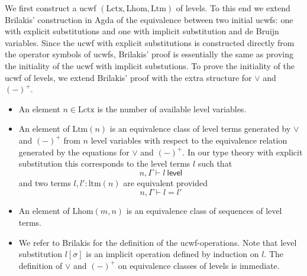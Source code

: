 \documentclass[11pt,a4paper]{article}
\theoremstyle{plain}
\theoremstyle{definition}
\newcommand{\level}{\mathsf{level}}
\newcommand{\Lctx}{\mathrm{Lctx}}
\newcommand{\Lsub}{\mathrm{Lhom}}
\newcommand{\Ltm}{\mathrm{Ltm}}
\def\lhom{\mathrm{lhom}}
\def\ltm{\mathrm{ltm}}
\def\lp{\mathrm{lp}}
\def\lq{\mathrm{lq}}
\def\s{\mathrm{s}}
\begin{document}
We first construct a ucwf $(\Lctx,\Lsub,\Ltm)$ of levels. To this end we extend Brilakis'  \cite{Brilakis18} construction in Agda of the equivalence between two initial ucwfs: one with explicit substitutions and one with implicit substitution and de Bruijn variables. Since the ucwf with explicit substitutions is constructed directly from the operator symbols of ucwfs, Brilakis' proof is essentially the same as proving the initiality of the ucwf with implicit substutions. To prove the initiality of the ucwf of levels, we extend Brilakis' proof with the extra structure for $\vee$ and $(-)^+$.
\begin{itemize}
\item An element $n \in \Lctx$ is the number of available level variables.
\item An element of $\Ltm(n)$ is an equivalence class of level terms generated by $\vee$ and $(-)^+$ from $n$ level variables with respect to the equivalence relation generated by the equations for $\vee$ and $(-)^+$. In our type theory with explicit substitution \cite{BezemCDE22} this corresponds to the level terms $l$ such that
$$
n, \Gamma \vdash l\ \level
$$
and two terms $l, l' : \ltm(n)$ are equivalent provided
$$
n, \Gamma \vdash l = l'
$$
\item An element of $\Lsub(m,n)$ is an equivalence class of sequences of level terms.
\item We refer to Brilakis for the definition of the ucwf-operations. Note that level substitution $l[\sigma]$ is an implicit operation defined by induction on $l$. The definition of $\vee$ and $(-)^+$ on equivalence classes of levels is immediate.
\end{itemize}
\end{document}
